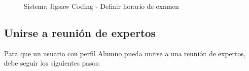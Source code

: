 \begin{enumerate}
\begin{figure}[h]
		\centering
		\caption{Sistema Jigsaw Coding - Definir horario de examen}
		\label{fig:sesionesjigsaw_nuevo_15}
	\end{figure}
\end{enumerate}

\subsection{Unirse a reunión de expertos}
Para que un usuario con perfil Alumno pueda unirse a una reunión de expertos, debe seguir los siguientes pasos:

